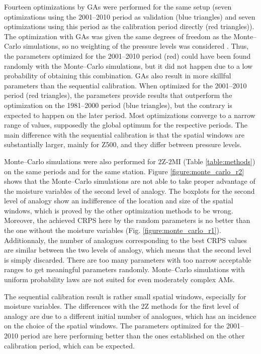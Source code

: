 \documentclass[review]{elsarticle}
\begin{document}
Fourteen optimizations by GAs were performed for the same setup (seven optimizations using the 2001--2010 period as validation (blue triangles) and seven optimizations using this period as the calibration period directly (red triangles)). The optimization with GAs was given the same degrees of freedom as the Monte--Carlo simulations, so no weighting of the pressure levels was considered \citep[as in][]{Horton2018a}. Thus, the parameters optimized for the 2001--2010 period (red) could have been found randomly with the Monte--Carlo simulations, but it did not happen due to a low probability of obtaining this combination. GAs also result in more skillful parameters than the sequential calibration. When optimized for the 2001--2010 period (red triangles), the parameters provide results that outperform the optimization on the 1981--2000 period (blue triangles), but the contrary is expected to happen on the later period. Most optimizations converge to a narrow range of values, supposedly the global optimum for the respective periods. The main difference with the sequential calibration is that the spatial windows are substantially larger, mainly for Z500, and they differ between pressure levels. 

Monte--Carlo simulations were also performed for 2Z-2MI (Table \ref{table:methods}) on the same periods and for the same station. Figure \ref{figure:monte_carlo_r2} shows that the Monte--Carlo simulations are not able to take proper advantage of the moisture variables of the second level of analogy. The boxplots for the second level of analogy show an indifference of the location and size of the spatial windows, which is proved by the other optimization methods to be wrong. Moreover, the achieved CRPS here by the random parameters is no better than the one without the moisture variables (Fig. \ref{figure:monte_carlo_r1}). Additionnaly, the number of analogues corresponding to the best CRPS values are similar between the two levels of analogy, which means that the second level is simply discarded. There are too many parameters with too narrow acceptable ranges to get meaningful parameters randomly. Monte--Carlo simulations with uniform probability laws are not suited for even moderately complex AMs. 

The sequential calibration result is rather small spatial windows, especially for moisture variables. The differences with the 2Z methods for the first level of analogy are due to a different initial number of analogues, which has an incidence on the choice of the spatial windows. The parameters optimized for the 2001--2010 period are here performing better than the ones established on the other calibration period, which can be expected.
\end{document}
